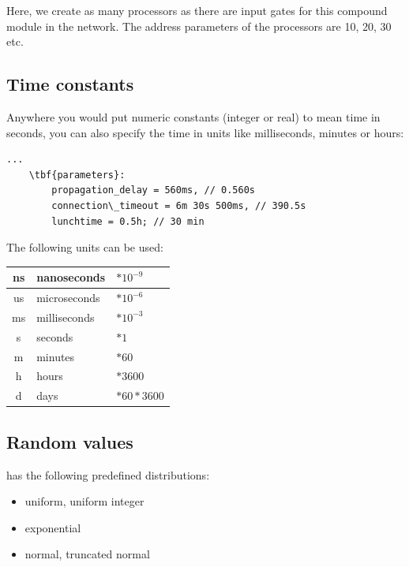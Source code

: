 Here, we create as many processors as there are input gates for 
this compound module in the network. The address parameters of 
the processors are 10, 20, 30 etc.





\subsection{Time constants}

Anywhere you would put numeric constants
(integer or real) to mean time in seconds, you can also specify the
time in units like milliseconds, minutes or hours:


\begin{Verbatim}[commandchars=\\\{\}]
    ... 
    \tbf{parameters}:
        propagation_delay = 560ms, // 0.560s
        connection\_timeout = 6m 30s 500ms, // 390.5s
        lunchtime = 0.5h; // 30 min
\end{Verbatim}


The following units can be used:

\begin{longtable}{|c|l|l|}
\hline
ns & nanoseconds & $*10^{-9}$ \\\hline
us & microseconds & $*10^{-6}$ \\\hline
ms & milliseconds & $*10^{-3}$ \\\hline
s  & seconds & $*1$ \\\hline
m  & minutes & $*60$ \\\hline
h  & hours & $*3600$ \\\hline
d  & days & $*60*3600$ \\\hline
\end{longtable}







\subsection{Random values}

{\opp} has the following predefined distributions:
\begin{itemize}
  \item{uniform, uniform integer}
  \item{exponential}
  \item{normal, truncated normal}
\end{itemize}

